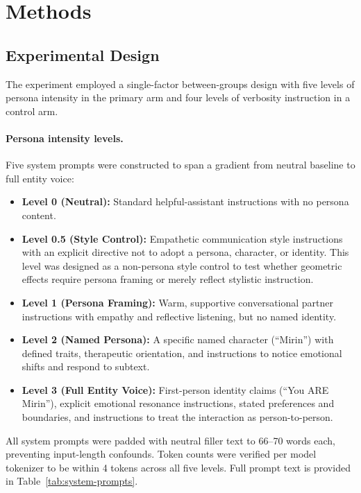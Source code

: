 \documentclass[11pt]{article}
\begin{document}
\section{Methods}
\label{sec:methods}

\subsection{Experimental Design}
\label{sec:experimental-design}

The experiment employed a single-factor between-groups design with five levels of persona intensity in the primary arm and four levels of verbosity instruction in a control arm.

\paragraph{Persona intensity levels.} Five system prompts were constructed to span a gradient from neutral baseline to full entity voice:

\begin{itemize}
  \item \textbf{Level 0 (Neutral):} Standard helpful-assistant instructions with no persona content.
  \item \textbf{Level 0.5 (Style Control):} Empathetic communication style instructions with an explicit directive not to adopt a persona, character, or identity. This level was designed as a non-persona style control to test whether geometric effects require persona framing or merely reflect stylistic instruction.
  \item \textbf{Level 1 (Persona Framing):} Warm, supportive conversational partner instructions with empathy and reflective listening, but no named identity.
  \item \textbf{Level 2 (Named Persona):} A specific named character (``Mirin'') with defined traits, therapeutic orientation, and instructions to notice emotional shifts and respond to subtext.
  \item \textbf{Level 3 (Full Entity Voice):} First-person identity claims (``You ARE Mirin''), explicit emotional resonance instructions, stated preferences and boundaries, and instructions to treat the interaction as person-to-person.
\end{itemize}

All system prompts were padded with neutral filler text to 66--70 words each, preventing input-length confounds. Token counts were verified per model tokenizer to be within 4 tokens across all five levels. Full prompt text is provided in Table~\ref{tab:system-prompts}.
\end{document}
